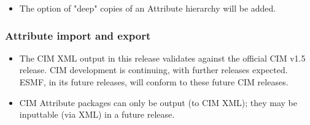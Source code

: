 \begin{itemize}
\item The option of "deep" copies of an Attribute hierarchy will be added.
\end{itemize}


\subsubsection{Attribute import and export}
\begin{itemize}
\item The CIM XML output in this release validates against the official CIM v1.5 release.  CIM development is continuing, with further releases expected.  ESMF, in its future releases, will conform to these future CIM releases.
\item CIM Attribute packages can only be output (to CIM XML); they may be inputtable (via XML) in a future release.
\end{itemize}
